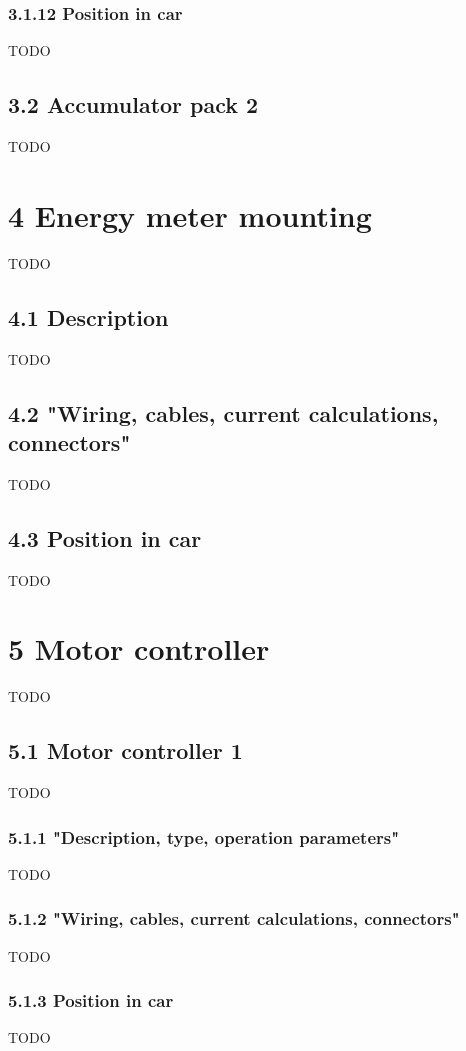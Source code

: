 \documentclass{article}
\begin{document}
\subsubsection*{3.1.12 Position in car}
TODO

\subsection*{3.2 Accumulator pack 2}
TODO

\section*{4 Energy meter mounting}
TODO

\subsection*{4.1 Description}
TODO

\subsection*{4.2 "Wiring, cables, current calculations, connectors"}
TODO

\subsection*{4.3 Position in car}
TODO

\section*{5 Motor controller}
TODO

\subsection*{5.1 Motor controller 1}
TODO

\subsubsection*{5.1.1 "Description, type, operation parameters"}
TODO

\subsubsection*{5.1.2 "Wiring, cables, current calculations, connectors"}
TODO

\subsubsection*{5.1.3 Position in car}
TODO
\end{document}
